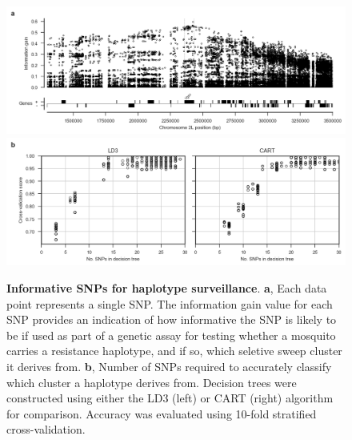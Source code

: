 \documentclass[a4paper,11pt,abstracton,hidelinks]{scrartcl}
\begin{document}
%
\begin{figure}[!t]
  \centering
  
  \includegraphics[width=1.0\linewidth]{artwork/info_gain.png}
  \includegraphics[width=1.0\linewidth]{artwork/tree_cv.png}
  
  \caption{%
%
\textbf{Informative SNPs for haplotype surveillance}. 
%
\textbf{a}, Each data point represents a single SNP. 
%
The information gain value for each SNP provides an indication of how informative the SNP is likely to be if used as part of a genetic assay for testing whether a mosquito carries a resistance haplotype, and if so, which seletive sweep cluster it derives from. 
%
\textbf{b}, Number of SNPs required to accurately classify which cluster a haplotype derives from. 
%
Decision trees were constructed using either the LD3 (left) or CART (right) algorithm for comparison.
%
Accuracy was evaluated using 10-fold stratified cross-validation.
}

  \label{fig:gain}
\end{figure}
\end{document}
